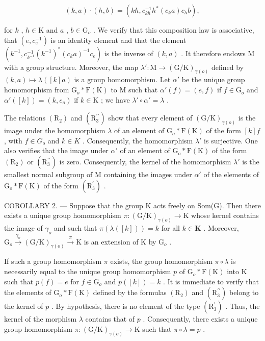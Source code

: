 \[
(k, a) \cdot (h, b) = (k h, c _ {k h} ^ {- 1} h ^ {*} (c _ {k} a) c _ {h} b),
\]

for \(k\) , \(h \in \mathrm{K}\) and \(a\) , \(b \in \mathrm{G}_o\) . We verify that this composition law is associative, that \((e, c_e^{-1})\) is an identity element and that the element \((k^{-1}, c_{k^{-1}}^{-1}(k^{-1})^*(c_k a)^{-1} c_e)\) is the inverse of \((k, a)\) . It therefore endows M with a group structure. Moreover, the map \(\lambda'\colon \mathrm{M} \to (\mathrm{G} / \mathrm{K})_{\gamma(o)}\) defined by \((k, a) \mapsto \lambda([k]a)\) is a group homomorphism. Let \(\alpha'\) be the unique group homomorphism from \(\mathrm{G}_o * \mathrm{F}(\mathrm{K})\) to M such that \(\alpha'(f) = (e, f)\) if \(f \in \mathrm{G}_o\) and \(\alpha'([k]) = (k, e_o)\) if \(k \in \mathrm{K}\) ; we have \(\lambda' \circ \alpha' = \lambda\) .

The relations \((\mathrm{R}_{2})\) and \((\mathrm{R}_{3}^{\prime\prime})\) show that every element of \((\mathrm{G}/\mathrm{K})_{\gamma(o)}\) is the image under the homomorphism \(\lambda\) of an element of \(\mathrm{G}_{o}*\mathrm{F}(\mathrm{K})\) of the form \([k]f\) , with \(f\in G_{o}\) and \(k\in K\) . Consequently, the homomorphism \(\lambda'\) is surjective. One also verifies that the image under \(\alpha'\) of an element of \(\mathrm{G}_{o}*\mathrm{F}(\mathrm{K})\) of the form \((\mathrm{R}_{2})\) or \((\mathrm{R}_{3}^{\prime\prime})\) is zero. Consequently, the kernel of the homomorphism \(\lambda'\) is the smallest normal subgroup of M containing the images under \(\alpha'\) of the elements of \(\mathrm{G}_{o}*\mathrm{F}(\mathrm{K})\) of the form \((\mathrm{R}_{3}^{\prime})\) .

COROLLARY 2. --- Suppose that the group K acts freely on Som(G). Then there exists a unique group homomorphism \(\pi\colon (\mathrm{G} / \mathrm{K})_{\gamma (o)}\to \mathrm{K}\) whose kernel contains the image of \(\gamma_{o}\) and such that \(\pi (\lambda ([k])) = k\) for all \(k\in \mathbf{K}\) . Moreover, \(\mathrm{G}_o\xrightarrow{\gamma_o} (\mathrm{G} / \mathrm{K})_{\gamma (o)}\xrightarrow{\pi}\mathrm{K}\) is an extension of K by \(\mathrm{G}_o\) .

If such a group homomorphism \(\pi\) exists, the group homomorphism \(\pi \circ \lambda\) is necessarily equal to the unique group homomorphism \(p\) of \(\mathrm{G}_{o} * \mathrm{F}(\mathrm{K})\) into \(\mathrm{K}\) such that \(p(f) = e\) for \(f \in \mathrm{G}_{o}\) and \(p([k]) = k\) . It is immediate to verify that the elements of \(\mathrm{G}_{o} * \mathrm{F}(\mathrm{K})\) defined by the formulas \((\mathrm{R}_{2})\) and \((\mathrm{R}_{3}^{\prime \prime})\) belong to the kernel of \(p\) . By hypothesis, there is no element of the type \((\mathrm{R}_{3}^{\prime})\) . Thus, the kernel of the morphism \(\lambda\) contains that of \(p\) . Consequently, there exists a unique group homomorphism \(\pi: (\mathrm{G} / \mathrm{K})_{\gamma(o)} \to \mathrm{K}\) such that \(\pi \circ \lambda = p\) .

